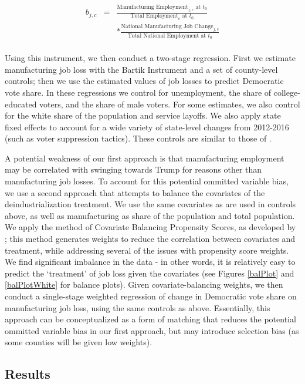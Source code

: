 \documentclass[]{AEA}
\begin{document}
\[
\begin{aligned}
b_{j,c} &=& \frac{\text{Manufacturing Employment}_{j,c} \text{ at } t_0}{\text{Total Employment}_c \text{ at }t_0}  \\
&&  * \frac{\text{National Manufacturing Job Change}_{j,c} }{\text{Total National Employment at }t_0} \\
\end{aligned}
\]

Using this instrument, we then conduct a two-stage regression. First we
estimate manufacturing job loss with the Bartik Instrument and a set of
county-level controls; then we use the estimated values of job losses to
predict Democratic vote share. In these regressions we control for
unemployment, the share of college-educated voters, and the share of
male voters. For some estimates, we also control for the white share of
the population and service layoffs. We also apply state fixed effects to
account for a wide variety of state-level changes from 2012-2016 (such
as voter suppression tactics). These controls are similar to those of
\cite{Baccini21}.

A potential weakness of our first approach is that manufacturing
employment may be correlated with swinging towards Trump for reasons
other than manufacturing job losses. To account for this potential
ommitted variable bias, we use a second approach that attempts to
balance the covariates of the deindustrialization treatment. We use the
same covariates as are used in controls above, as well as manufacturing
as share of the population and total population. We apply the method of
Covariate Balancing Propensity Scores, as developed by \cite{Imai14};
this method generates weights to reduce the correlation between
covariates and treatment, while addressing several of the issues with
propensity score weights. We find significant imbalance in the data - in
other words, it is relatively easy to predict the `treatment' of job
loss given the covariates (see Figures \ref{balPlot} and
\ref{balPlotWhite} for balance plots). Given covariate-balancing
weights, we then conduct a single-stage weighted regression of change in
Democratic vote share on manufacturing job loss, using the same controls
as above. Essentially, this approach can be conceptualized as a form of
matching that reduces the potential ommitted variable bias in our first
approach, but may introduce selection bias (as some counties will be
given low weights).

\subsection{Results}
\end{document}
